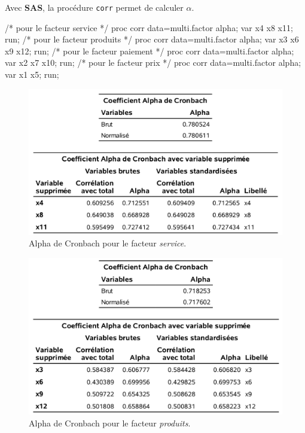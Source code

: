 \documentclass[
  11pt,
  letterpaper,
]{book}
\newenvironment{Shaded}{\begin{snugshade}}{\end{snugshade}}
\newcommand{\NormalTok}[1]{#1}
\theoremstyle{definition}
\theoremstyle{definition}
\theoremstyle{definition}
\theoremstyle{definition}
\theoremstyle{remark}
\begin{document}
Avec \textbf{SAS}, la procédure \texttt{corr} permet de calculer \(\alpha\).

\begin{Shaded}
\begin{Highlighting}[]
\NormalTok{/* pour le facteur service */}
\NormalTok{proc corr data=multi.factor alpha;}
\NormalTok{var x4 x8 x11;}
\NormalTok{run;}
\NormalTok{/* pour le facteur produits */}
\NormalTok{proc corr data=multi.factor alpha;}
\NormalTok{var x3 x6 x9 x12;}
\NormalTok{run;}
\NormalTok{/* pour le facteur paiement */}
\NormalTok{proc corr data=multi.factor alpha;}
\NormalTok{var x2 x7 x10;}
\NormalTok{run;}
\NormalTok{/* pour le facteur prix */}
\NormalTok{proc corr data=multi.factor alpha;}
\NormalTok{var x1 x5;}
\NormalTok{run;}
\end{Highlighting}
\end{Shaded}









\begin{figure}

{\centering \includegraphics[width=0.85\linewidth]{figures/01-facto-e8} 

}

\caption{Alpha de Cronbach pour le facteur \emph{service}.}\label{fig:fig1p8}
\end{figure}

\begin{figure}

{\centering \includegraphics[width=0.85\linewidth]{figures/01-facto-e9} 

}

\caption{Alpha de Cronbach pour le facteur \emph{produits}.}\label{fig:fig1p9}
\end{figure}
\end{document}
